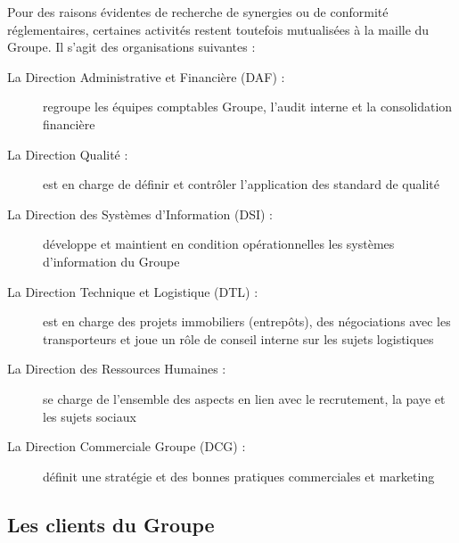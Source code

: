             Pour des raisons évidentes de recherche de synergies ou de conformité réglementaires, certaines activités restent toutefois mutualisées à la maille du Groupe.
            Il s'agit des organisations suivantes :
            \begin{description}
                \item[La Direction Administrative et Financière (DAF) :] regroupe les équipes comptables Groupe, l'audit interne et la consolidation financière
                \item[La Direction Qualité :] est en charge de définir et contrôler l'application des standard de qualité
                \item[La Direction des Systèmes d'Information (DSI) :] développe et maintient en condition opérationnelles les systèmes d'information du Groupe
                \item[La Direction Technique et Logistique (DTL) :] est en charge des projets immobiliers (entrepôts), des négociations avec les transporteurs et joue un rôle de conseil interne sur les sujets logistiques
                \item[La Direction des Ressources Humaines :] se charge de l'ensemble des aspects en lien avec le recrutement, la paye et les sujets sociaux
                \item[La Direction Commerciale Groupe (DCG) :] définit une stratégie et des bonnes pratiques commerciales et marketing
            \end{description}

            \subsection{Les clients du Groupe}
            \label{clients}

